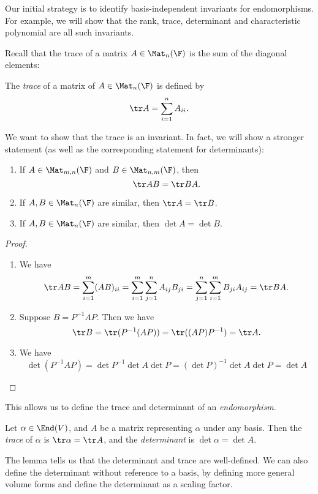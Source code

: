 \documentclass[a4paper]{article}
\begin{document}
Our initial strategy is to identify basis-independent invariants for endomorphisms. For example, we will show that the rank, trace, determinant and characteristic polynomial are all such invariants.

Recall that the trace of a matrix $A \in \Mat_n(\F)$ is the sum of the diagonal elements:
\begin{defi}[Trace]
  The \emph{trace} of a matrix of $A \in \Mat_n(\F)$ is defined by
  \[
    \tr A = \sum_{i = 1}^n A_{ii}.
  \]
\end{defi}

We want to show that the trace is an invariant. In fact, we will show a stronger statement (as well as the corresponding statement for determinants):
\begin{lemma}\leavevmode
  \begin{enumerate}
    \item If $A \in \Mat_{m, n}(\F)$ and $B\in \Mat_{n, m}(\F)$, then
      \[
        \tr AB = \tr BA.
      \]
    \item If $A, B \in \Mat_n(\F)$ are similar, then $\tr A = \tr B$.
    \item If $A, B \in \Mat_n(\F)$ are similar, then $\det A = \det B$.
  \end{enumerate}
\end{lemma}

\begin{proof}\leavevmode
  \begin{enumerate}
    \item We have
      \[
        \tr AB = \sum_{i = 1}^m (AB)_{ii} = \sum_{i = 1}^m \sum_{j = 1}^n A_{ij}B_{ji} = \sum_{j = 1}^n \sum_{i = 1}^m B_{ji}A_{ij} = \tr BA.
      \]
    \item Suppose $B = P^{-1}AP$. Then we have
      \[
        \tr B = \tr (P^{-1}(AP)) = \tr ((AP)P^{-1}) = \tr A.
      \]
    \item We have
      \[
        \det (P^{-1}AP) = \det P^{-1} \det A \det P = (\det P)^{-1} \det A \det P = \det A
      \]
  \end{enumerate}
\end{proof}
This allows us to define the trace and determinant of an \emph{endomorphism}.
\begin{defi}
  Let $\alpha \in \End(V)$, and $A$ be a matrix representing $\alpha$ under any basis. Then the \emph{trace} of $\alpha$ is $\tr \alpha = \tr A$, and the \emph{determinant} is $\det \alpha = \det A$.
\end{defi}
The lemma tells us that the determinant and trace are well-defined. We can also define the determinant without reference to a basis, by defining more general volume forms and define the determinant as a scaling factor.
\end{document}

